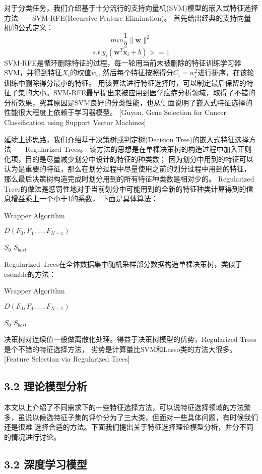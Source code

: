 \documentclass[a4paper,UTF8]{article}
\begin{document}
对于分类任务，我们介绍基于十分流行的支持向量机(SVM)模型的嵌入式特征选择方法——SVM-RFE(Recursive Feature Elimination)。
首先给出经典的支持向量机的公式定义：
$$ min \frac{1}{2}\parallel \textbf{w} \parallel^{2} $$
$$ s.t. y_{i}(\textbf{w}^{T}\textbf{x}_{i}+b)>=1 $$
SVM-RFE是循环删除特征的过程，每一轮用当前未被删除的特征训练学习器SVM，并得到特征$X_{i}$的权值$w_{i}$,
然后每个特征按照得分$C_{i}=w_{i}^{2}$进行排序，在该轮训练中删除得分最小的特征。
用该算法进行特征选择时，可以制定最后保留的特征子集的大小。SVM-RFE最早提出来被应用到医学癌症分析领域，取得了不错的
分析效果，究其原因是SVM良好的分类性能，也从侧面说明了嵌入式特征选择的性能很大程度上依赖于学习器模型。
[Guyon, Gene Selection for Cancer Classification using Support Vector Machines]


延续上述思路，我们介绍基于决策树或判定树(Decision Tree)的嵌入式特征选择方法——Regularized Trees。
该方法的思想是在单棵决策树的构造过程中加入正则化项，目的是尽量减少划分中设计的特征的种类数；
因为划分中用到的特征可以认为是重要的特征，那么在划分过程中尽量使用之前的划分过程中用到的特征，
那么最后决策树构造完成时划分用到的所有特征种类数是相对少的。
Regularized Trees的做法是惩罚性地对于当前划分中可能用到的全新的特征种类计算得到的信息增益乘上一个小于1的系数，
下面是具体算法：

\begin{algorithm}
  \caption{Wrapper Algorithm}
  \begin{algorithmic}
    \REQUIRE $ D(F_{0}, F_{1},..., F_{N-1})$

             $ S_{0}$
    \ENSURE $ S_{best} $

  \end{algorithmic}




\end{algorithm}
Regularized Trees在全体数据集中随机采样部分数据构造单棵决策树，类似于esemble的方法：
\begin{algorithm}
  \caption{Wrapper Algorithm}
  \begin{algorithmic}
    \REQUIRE $ D(F_{0}, F_{1},..., F_{N-1})$

             $ S_{0}$
    \ENSURE $ S_{best} $

  \end{algorithmic}




\end{algorithm}

决策树对连续值一般做离散化处理。得益于决策树模型的优势，Regularized Trees是个不错的特征选择方法，
劣势是计算量比SVM和Lasso类的方法大很多。[Feature Selection via Regularized Trees]



\subsection*{3.2 理论模型分析}

本文以上介绍了不同需求下的一些特征选择方法，可以说特征选择领域的方法繁多，虽说以候选特征子集的评价分为了三大类，但面对一些具体问题，有时候我们还是很难
选择合适的方法。下面我们提出关于特征选择理论模型分析，并分不同的情况进行讨论。


\subsection*{3.2 深度学习模型}
\end{document}
